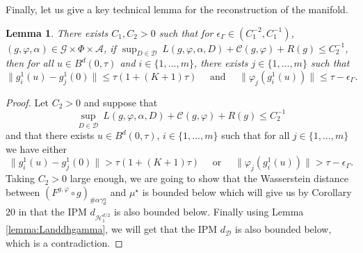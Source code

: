 \documentclass[10pt]{article}
\newtheorem{lemma}{Lemma}
\begin{document}
Finally, let us give a key technical lemma for the reconstruction of the manifold.
 \begin{lemma}\label{lemma:firstr} There exists $C_1,C_2>0$ such that for $\epsilon_\Gamma \in (C_1^{-2},C_1^{-1})$, $(g,\varphi,\alpha)\in \mathcal{G}\times  \Phi\times \mathcal{A}$, if $\sup_{D\in \mathcal{D}} \ L(g,\varphi,\alpha,D)+\mathcal{C}(g,\varphi)+R(g)\leq C_2^{-1}$, then  
    for all $u\in B^d(0,\tau)$ and $i\in \{1,...,m\}$, there exists $j\in \{1,...,m\}$ such that
    $$
    \|g_i^1(u)-g_j^1(0)\|\leq \tau(1+(K+1)\tau)\quad \text{ and }\quad \|\varphi_j(g_i^1(u))\|\leq \tau -\epsilon_\Gamma.
    $$
\end{lemma}

\begin{proof}
Let $C_2>0$ and suppose that 
\begin{equation}\label{eq:bghidodhzpfjdoss}
\sup_{D\in \mathcal{D}} \ L(g,\varphi,\alpha,D)+\mathcal{C}(g,\varphi)+R(g)\leq C_2^{-1}
\end{equation}
and that there exists $u\in B^d(0,\tau)$, $i\in \{1,...,m\}$ such that for all $j\in \{1,...,m\}$ we have either
    $$\|g_i^1(u)-g_j^1(0)\|> \tau(1+(K+1)\tau) \quad \text{ or }\quad \|\varphi_j(g_i^1(u))\|> \tau -\epsilon_\Gamma.$$
Taking $C_2>0$ large enough, we are going to show that the Wasserstein distance between $(F^{g,\varphi}\circ g)_{\# \alpha \gamma_d^n}$ and $\mu^\star$ is bounded below which will give us by Corollary 20 in \cite{stephanovitch2024ipm} that the IPM $d_{\mathcal{H}_1^{d/2}}$ is also bounded below. Finally using Lemma \ref{lemma:Landdhgamma}, we will get that the IPM $d_{\mathcal{D}}$ is also bounded below, which is a contradiction.



\end{proof}
\end{document}
